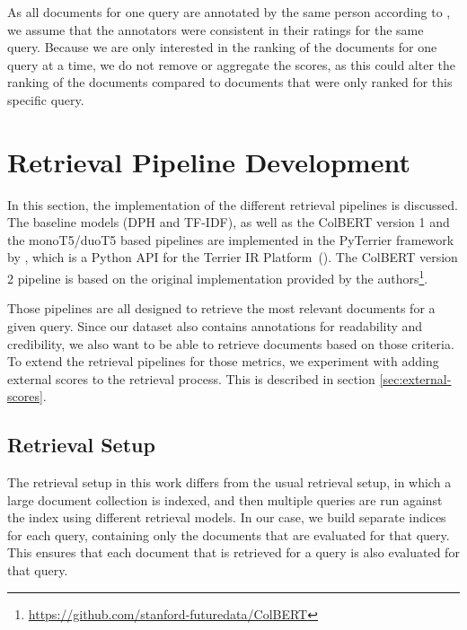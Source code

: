 As all documents for one query are annotated by the same person according to \cite{goeuriot:2021:Consumer}, we assume that the annotators were consistent in their ratings for the same query.
Because we are only interested in the ranking of the documents for one query at a time, we do not remove or aggregate the scores, as this could alter the ranking of the documents compared to documents that were only ranked for this specific query.

\section{Retrieval Pipeline Development}
In this section, the implementation of the different retrieval pipelines is discussed.
The baseline models (DPH and TF-IDF), as well as the ColBERT version 1 and the monoT5/duoT5 based pipelines are implemented in the PyTerrier framework by \cite{pyterrier:2020:Declarative}, which is a Python API for the Terrier IR Platform~(\cite{macdonald:2012:From}).
The ColBERT version 2 pipeline is based on the original implementation provided by the authors\footnote{\url{https://github.com/stanford-futuredata/ColBERT}}.

Those pipelines are all designed to retrieve the most relevant documents for a given query.
Since our dataset also contains annotations for readability and credibility, we also want to be able to retrieve documents based on those criteria.
To extend the retrieval pipelines for those metrics, we experiment with adding external scores to the retrieval process.
This is described in section \ref{sec:external-scores}.


\subsection{Retrieval Setup}
The retrieval setup in this work differs from the usual retrieval setup, in which a large document collection is indexed, and then multiple queries are run against the index using different retrieval models.
In our case, we build separate indices for each query, containing only the documents that are evaluated for that query.
This ensures that each document that is retrieved for a query is also evaluated for that query.

